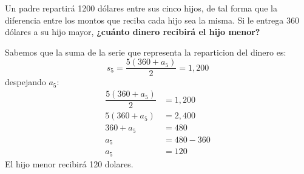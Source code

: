 Un padre repartirá 1200 dólares entre sus cinco hijos, de tal forma que la diferencia entre los montos que reciba cada hijo sea la misma.
Si le entrega 360 dólares a su hijo mayor,
\textbf{¿cuánto dinero recibirá el hijo menor?}

\begin{solutionbox}{7cm}
    Sabemos que la suma de la serie que representa la reparticion del dinero es:
    \[s_{5}=\dfrac{5(360+a_{5})}{2}=1,200\]
    despejando $a_5$:
    \begin{align*}
        \dfrac{5(360+a_{5})}{2} & =1,200   \\
        5(360+a_{5})            & =2,400   \\
        360+a_{5}               & =480     \\
        a_{5}                   & =480-360 \\
        a_{5}                   & =120
    \end{align*}
    El hijo menor recibirá 120 dolares.
\end{solutionbox}